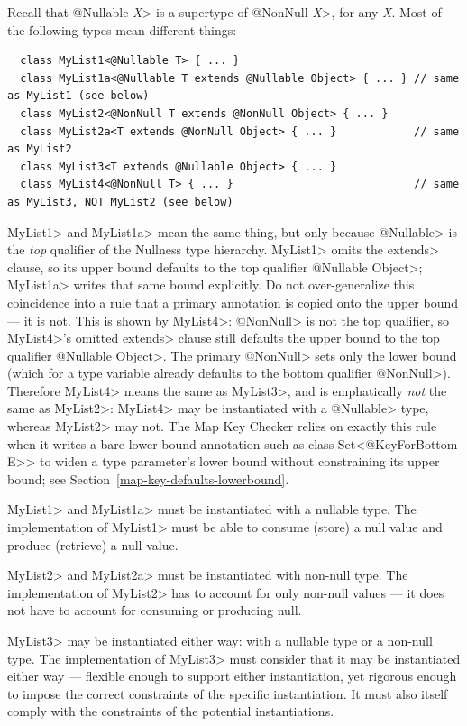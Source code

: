 Recall that \<@Nullable \emph{X}> is a supertype of \<@NonNull \emph{X}>,
for any \emph{X}\@.
Most of the following types mean different things:

\begin{Verbatim}
  class MyList1<@Nullable T> { ... }
  class MyList1a<@Nullable T extends @Nullable Object> { ... } // same as MyList1 (see below)
  class MyList2<@NonNull T extends @NonNull Object> { ... }
  class MyList2a<T extends @NonNull Object> { ... }            // same as MyList2
  class MyList3<T extends @Nullable Object> { ... }
  class MyList4<@NonNull T> { ... }                            // same as MyList3, NOT MyList2 (see below)
\end{Verbatim}

\<MyList1> and \<MyList1a> mean the same thing, but only because
\<@Nullable> is the \emph{top} qualifier of the Nullness type hierarchy.
\<MyList1> omits the \<extends> clause, so its upper bound defaults to the
top qualifier \<@Nullable Object>; \<MyList1a> writes that same bound
explicitly.  Do not over-generalize this coincidence into a rule that a
primary annotation is copied onto the upper bound --- it is not.  This is
shown by \<MyList4>:  \<@NonNull> is not the top qualifier, so
\<MyList4>'s omitted \<extends> clause still defaults the upper bound to the
top qualifier \<@Nullable Object>.  The primary \<@NonNull> sets only the
lower bound (which for a type variable already defaults to the bottom
qualifier \<@NonNull>).  Therefore \<MyList4> means the same as \<MyList3>,
and is emphatically \emph{not} the same as \<MyList2>:  \<MyList4> may be
instantiated with a \<@Nullable> type, whereas \<MyList2> may not.  The Map
Key Checker relies on exactly this rule when it writes a bare lower-bound
annotation such as \<class Set<@KeyForBottom E>> to widen a type
parameter's lower bound without constraining its upper bound; see
Section~\ref{map-key-defaults-lowerbound}.

\<MyList1> and \<MyList1a> must be instantiated with a nullable type.
The implementation of \<MyList1> must be able to consume (store) a null
value and produce (retrieve) a null value.

\<MyList2> and \<MyList2a> must be instantiated with non-null type.
The implementation of \<MyList2> has to account for only non-null values --- it
does not have to account for consuming or producing null.

\<MyList3> may be instantiated either way:
with a nullable type or a non-null type.  The implementation of \<MyList3> must consider
that it may be instantiated either way --- flexible enough to support either
instantiation, yet rigorous enough to impose the correct constraints of the
specific instantiation.  It must also itself comply with the constraints of
the potential instantiations.

